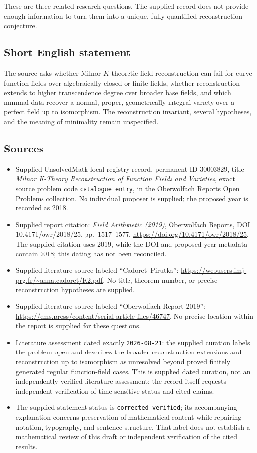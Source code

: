 \documentclass[11pt]{article}
\begin{document}
These are three related research questions. The supplied record does not provide enough information to turn them into a unique, fully quantified reconstruction conjecture.
\subsection{Short English statement}
The source asks whether Milnor \(K\)-theoretic field reconstruction can fail for curve function fields over algebraically closed or finite fields, whether reconstruction extends to higher transcendence degree over broader base fields, and which minimal data recover a normal, proper, geometrically integral variety over a perfect field up to isomorphism. The reconstruction invariant, several hypotheses, and the meaning of minimality remain unspecified.
\subsection{Sources}
\begin{itemize}
\item Supplied UnsolvedMath local registry record, permanent ID \(30003829\), title \emph{Milnor K-Theory Reconstruction of Function Fields and Varieties}, exact source problem code \texttt{catalogue entry}, in the Oberwolfach Reports Open Problems collection. No individual proposer is supplied; the proposed year is recorded as 2018.
\item Supplied report citation: \emph{Field Arithmetic (2019)}, Oberwolfach Reports, DOI 10.4171/owr/2018/25, pp.\ 1517--1577. \url{https://doi.org/10.4171/owr/2018/25}. The supplied citation uses 2019, while the DOI and proposed-year metadata contain 2018; this dating has not been reconciled.
\item Supplied literature source labeled ``Cadoret--Pirutka'': \url{https://webusers.imj-prg.fr/~anna.cadoret/K2.pdf}. No title, theorem number, or precise reconstruction hypotheses are supplied.
\item Supplied literature source labeled ``Oberwolfach Report 2019'': \url{https://ems.press/content/serial-article-files/46747}. No precise location within the report is supplied for these questions.
\item Literature assessment dated exactly \texttt{2026-08-21}: the supplied curation labels the problem open and describes the broader reconstruction extensions and reconstruction up to isomorphism as unresolved beyond proved finitely generated regular function-field cases. This is supplied dated curation, not an independently verified literature assessment; the record itself requests independent verification of time-sensitive status and cited claims.
\item The supplied statement status is \texttt{corrected\_verified}; its accompanying explanation concerns preservation of mathematical content while repairing notation, typography, and sentence structure. That label does not establish a mathematical review of this draft or independent verification of the cited results.
\end{itemize}
\end{document}

